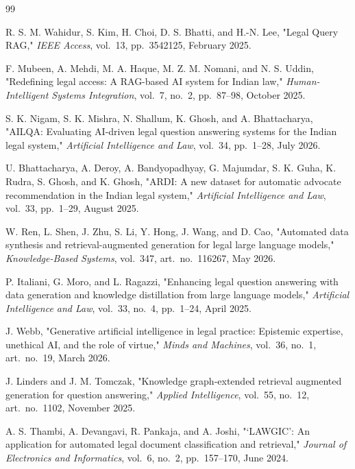 \documentclass[12pt,a4paper]{report}
\begin{document}
\begin{thebibliography}{99}
\sloppy

R. S. M. Wahidur, S. Kim, H. Choi, D. S. Bhatti, and H.-N. Lee, "Legal Query RAG," \textit{IEEE Access}, vol.~13, pp.~3542125, February 2025.

F. Mubeen, A. Mehdi, M. A. Haque, M. Z. M. Nomani, and N. S. Uddin, "Redefining legal access: A RAG-based AI system for Indian law," \textit{Human-Intelligent Systems Integration}, vol.~7, no.~2, pp.~87--98, October 2025.

S. K. Nigam, S. K. Mishra, N. Shallum, K. Ghosh, and A. Bhattacharya, "AILQA: Evaluating AI-driven legal question answering systems for the Indian legal system," \textit{Artificial Intelligence and Law}, vol.~34, pp.~1--28, July 2026.

U. Bhattacharya, A. Deroy, A. Bandyopadhyay, G. Majumdar, S. K. Guha, K. Rudra, S. Ghosh, and K. Ghosh, "ARDI: A new dataset for automatic advocate recommendation in the Indian legal system," \textit{Artificial Intelligence and Law}, vol.~33, pp.~1--29, August 2025.

W. Ren, L. Shen, J. Zhu, S. Li, Y. Hong, J. Wang, and D. Cao, "Automated data synthesis and retrieval-augmented generation for legal large language models," \textit{Knowledge-Based Systems}, vol.~347, art.~no.~116267, May 2026.

P. Italiani, G. Moro, and L. Ragazzi, "Enhancing legal question answering with data generation and knowledge distillation from large language models," \textit{Artificial Intelligence and Law}, vol.~33, no.~4, pp.~1--24, April 2025.

J. Webb, "Generative artificial intelligence in legal practice: Epistemic expertise, unethical AI, and the role of virtue," \textit{Minds and Machines}, vol.~36, no.~1, art.~no.~19, March 2026.

J. Linders and J. M. Tomczak, "Knowledge graph-extended retrieval augmented generation for question answering," \textit{Applied Intelligence}, vol.~55, no.~12, art.~no.~1102, November 2025.

A. S. Thambi, A. Devangavi, R. Pankaja, and A. Joshi, "‘LAWGIC’: An application for automated legal document classification and retrieval," \textit{Journal of Electronics and Informatics}, vol.~6, no.~2, pp.~157--170, June 2024.


\end{thebibliography}
\end{document}

